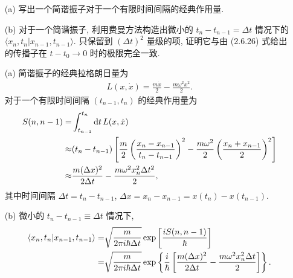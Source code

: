 \documentclass{assignment}
\begin{document}
\begin{prob}[2.34]
    \begin{itemize}
        \item[(a)] 写出一个简谐振子对于一个有限时间间隔的经典作用量.
        \item[(b)] 对于一个简谐振子, 利用费曼方法构造出微小的 $t_n-t_{n-1}=\Delta t$ 情况下的 $\langle x_n,t_n\vert x_{n-1},t_{n-1}\rangle$. 只保留到 $(\Delta t)^2$ 量级的项, 证明它与由 (2.6.26) 式给出的传播子在 $t-t_0\rightarrow 0$ 时的极限完全一致.
    \end{itemize}
\end{prob}
\begin{sol}
    \begin{itemize}
        \item[(a)] 简谐振子的经典拉格朗日量为
        \begin{align}
            L(x,\dot{x})=\frac{m\dot{x}}{2}-\frac{m\omega^2x^2}{2}.
        \end{align}
        对于一个有限时间间隔 $(t_{n-1},t_n)$ 的经典作用量为
        \begin{align}
            \notag S(n,n-1)=&\int_{t_{n-1}}^{t_n}\mathrm{d}t\,L(x,\dot{x})\\
            \notag\approx&(t_n-t_{n-1})\left[\frac{m}{2}\left(\frac{x_n-x_{n-1}}{t_n-t_{n-1}}\right)^2-\frac{m\omega^2}{2}\left(\frac{x_n+x_{n-1}}{2}\right)^2\right]\\
            \approx&\frac{m(\Delta x)^2}{2\Delta t}-\frac{m\omega^2x_n^2\Delta t^2}{2},
        \end{align}
        其中时间间隔 $\Delta t=t_n-t_{n-1}$, $\Delta x=x_n-x_{n-1}=x(t_n)-x(t_{n-1})$.
        \item[(b)] 微小的 $t_n-t_{n-1}\equiv\Delta t$ 情况下,
        \begin{align}
            \notag\langle x_n,t_n\vert x_{n-1},t_{n-1}\rangle=&\sqrt{\frac{m}{2\pi i\hbar\Delta t}}\exp\left[\frac{iS(n,n-1)}{\hbar}\right]\\
            =&\sqrt{\frac{m}{2\pi i\hbar\Delta t}}\exp\left\{\frac{i}{\hbar}\left[\frac{m(\Delta x)^2}{2\Delta t}-\frac{m\omega^2x_n^2\Delta t}{2}\right]\right\}.
        \end{align}


\end{itemize}
\end{sol}
\end{document}
